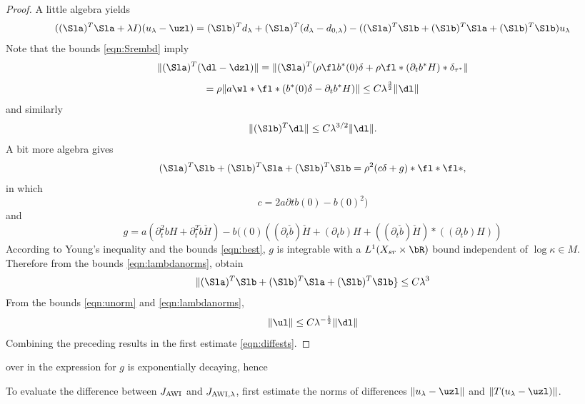 \begin{proof}
  A little algebra yields
  \begin{equation}
    \label{eqn:step1}
    ((\Sla)^T\Sla + \lambda I) (u_{\lambda}-\uzl) = (\Slb)^T d_{\lambda} + (\Sla)^T(d_{\lambda}-d_{0,\lambda})- 
    ((\Sla)^T\Slb + (\Slb)^T\Sla + (\Slb)^T\Slb)u_{\lambda}
  \end{equation}
  Note that the bounds \ref{eqn:Srembd} imply
\[
  \|(\Sla)^T (\dl-\dzl)\| = \|(\Sla)^T(\rho \fl b^*(0)\delta +
  \rho \fl*(\partial_tb^*H)*\delta_{\tau^*}\|
\]
\[
  = \rho \|a \wl * \fl * (b^*(0)\delta - \partial_tb^*H)\|
  \le C \lambda^{\frac{3}{2}}\|\dl\|
\]
and similarly
\[
 \| (\Slb)^T\dl \| \le C \lambda^{3/2}\|\dl\|.
\]
A bit more algebra gives
\[
  (\Sla)^T\Slb + (\Slb)^T\Sla + (\Slb)^T\Slb = \rho^2 (c \delta + g) *
  \fl * \fl *,
\]
in which
\[
  c = 2a \partial t b(0) - b(0)^2)
\]
and
\[
  g = a(\partial^2_t b H + \partial^2_t \check{b}\check{H}) -
  b((0)((\partial_t \check{b}) \check{H} + (\partial_t b) H +
  ((\partial_t \check{b}) \check{H})*((\partial_t b)H)) 
\]
According to Young's inequality and the bounds \ref{eqn:best}, $g$ is integrable with a 
$L^1(X_{sr}\times \bR)$ bound independent of $\log \kappa \in
M$. Therefore from the bounds \ref{eqn:lambdanorms}, obtain
\begin{equation}
  \label{eqn:step2}
\|(\Sla)^T\Slb + (\Slb)^T\Sla + (\Slb)^T\Slb\} \le C \lambda^3
\end{equation}
From the bounds \ref{eqn:unorm} and \ref{eqn:lambdanorms},
\[
  \|\ul\| \le C \lambda^{-\frac{1}{2}}\|\dl\|
\]
Combining the preceding results in the first estimate
\ref{eqn:diffests}.

\end{proof}


over in the expression for $g$ is exponentially decaying, hence

To evaluate the difference between $J_{\rm AWI}$ and
$J_{\rm AWI,\lambda}$, first estimate the norms of differences
$\|u_{\lambda} - \uzl\|$ and $\|T(u_{\lambda} -
\uzl)\|$.

